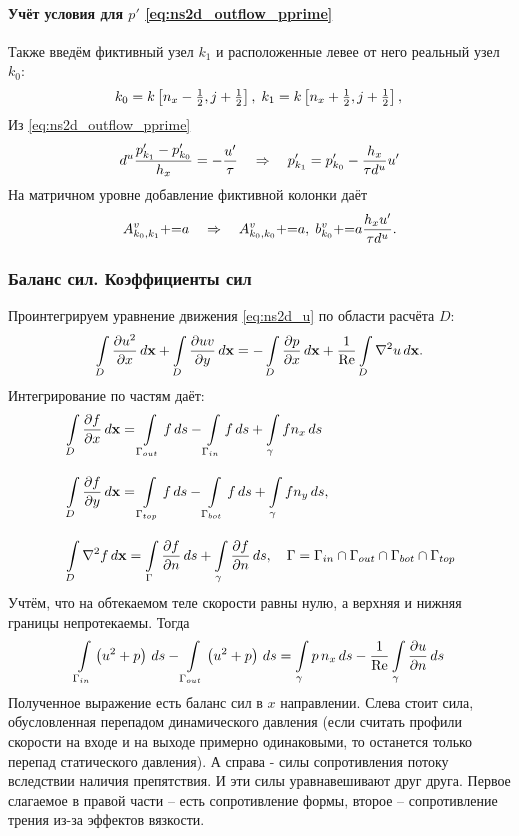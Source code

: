 \paragraph{Учёт условия для $p'$ \cref{eq:ns2d_outflow_pprime}}
Также введём фиктивный узел $k_1$ и расположенные левее от него реальный узел $k_0$:
\begin{equation*}
k_0 = k\left[n_x - \tfrac12, j+\tfrac12\right], \; k_1 = k\left[n_x + \tfrac12, j+\tfrac12 \right], \\
\end{equation*}
Из \cref{eq:ns2d_outflow_pprime}
\begin{equation*}
d^u \frac{p'_{k_1} - p'_{k_0}}{h_x} = -\frac{u'}{\tau} \hence p'_{k_1} = p'_{k_0} -\frac{h_x}{\tau d^u} u'
\end{equation*}
На матричном уровне добавление фиктивной колонки даёт
\begin{equation}
\label{eq:ns2d_outflow_pstrike_mat}
A^v_{k_0, k_1} \pluseq a \hence A^v_{k_0, k_0} \pluseq a, \; b^v_{k_0} \pluseq a \frac{h_x u'}{\tau d^u}.
\end{equation}

\subsubsection{Баланс сил. Коэффициенты сил}

Проинтегрируем уравнение движения 
\cref{eq:ns2d_u}
по области расчёта $D$:
$$
\arint{\dfr{u^2}{x}}{D}{\vec x} +
\arint{\dfr{uv}{y}}{D}{\vec x} =
-\arint{\dfr{p}{x}}{D}{\vec x} + \frac{1}{\Ren} \arint{\nabla^2 u}{D}{\vec x}.
$$
Интегрирование по частям даёт:
\begin{align*}
&\arint{\dfr{f}{x}}{D}{\vec x} = \arint{f}{\Gamma_{out}}{s} - \arint{f}{\Gamma_{in}}{s} + \arint{f n_x}{\gamma}{s} \\[10pt]
&\arint{\dfr{f}{y}}{D}{\vec x} = \arint{f}{\Gamma_{top}}{s} - \arint{f}{\Gamma_{bot}}{s}+ \arint{f n_y}{\gamma}{s}, \\[10pt]
&\arint{\nabla^2 f}{D}{\vec x} = \arint{\dfr{f}{n}}{\Gamma}{s} + \arint{\dfr{f}{n}}{\gamma}{s}, \quad \Gamma = \Gamma_{in} \cap \Gamma_{out} \cap \Gamma_{bot} \cap \Gamma_{top}
\end{align*}
Учтём, что на обтекаемом теле скорости равны нулю, а верхняя и нижняя границы непротекаемы.
Тогда
$$
\arint{\left(u^2 + p\right)}{\Gamma_{in}}{s}
-\arint{\left(u^2 + p\right)}{\Gamma_{out}}{s} =
\arint{p \, n_x}{\gamma}{s} - \frac1\Ren\arint{\dfr{u}{n}}{\gamma}{s}
$$
Полученное выражение есть баланс сил в $x$ направлении.
Слева стоит сила, обусловленная перепадом динамического давления
(если считать профили скорости на входе и на выходе примерно одинаковыми, то останется только перепад статического давления).
А справа - силы сопротивления потоку вследствии наличия препятствия. И эти силы уравнавешивают друг друга.
Первое слагаемое в правой части -- есть сопротивление формы, второе -- сопротивление трения из-за эффектов вязкости.

